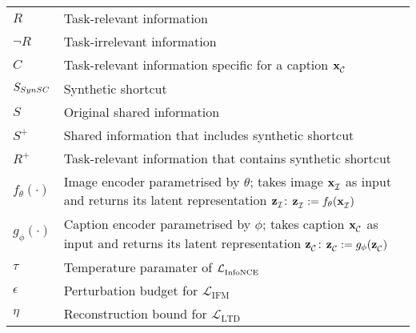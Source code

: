 \begin{table}[htb!]
\begin{tabular}{p{} p{}}
$R$ & Task-relevant information \\ \cmidrule{2-2}
$\neg R$ & Task-irrelevant information \\ \cmidrule{2-2}
$C$ & Task-relevant information specific for a caption $\mathbf{x}_{\mathcal{C}_{}}^{}$ \\ \cmidrule{2-2}
$S_{SynSC}{}$ & Synthetic shortcut \\ \cmidrule{2-2}
$S$ & Original shared information \\ \cmidrule{2-2}
$S^{+}$ & Shared information that includes synthetic shortcut  \\ \cmidrule{2-2}
$R^{+}$ & Task-relevant information that contains synthetic shortcut \\ \cmidrule{2-2}
$f_{\theta}(\cdot)$ & Image encoder parametrised by $\theta$; takes image $\mathbf{x}_{\mathcal{I}}^{}$ as input and returns its latent representation $\mathbf{z}_{\mathcal{I}_{}}^{}$: $\mathbf{z}_{\mathcal{I}_{}}^{} := f_{\theta}(\mathbf{x}_{\mathcal{I}}^{})$  
\\ \cmidrule{2-2}
$g_{\phi}(\cdot)$ & Caption encoder parametrised by $\phi$; takes caption $\mathbf{x}_{\mathcal{C}_{}}^{}$ as input and returns its latent representation $\mathbf{z}_{\mathcal{C}_{}}^{}$: $\mathbf{z}_{\mathcal{C}_{}}^{} := g_{\phi}(\mathbf{z}_{\mathcal{C}_{}}^{})$ 
\\  \cmidrule{2-2}
$\tau$ & Temperature paramater of $\mathcal{L}_{\text{InfoNCE}}^{}$ \\  \cmidrule{2-2}
$\epsilon$ & Perturbation budget for $\mathcal{L}_{\text{IFM}}$\\  \cmidrule{2-2}
$\eta$ & Reconstruction bound  for $\mathcal{L}_{\text{LTD}}$ \\
\bottomrule
\end{tabular}
\end{table}
